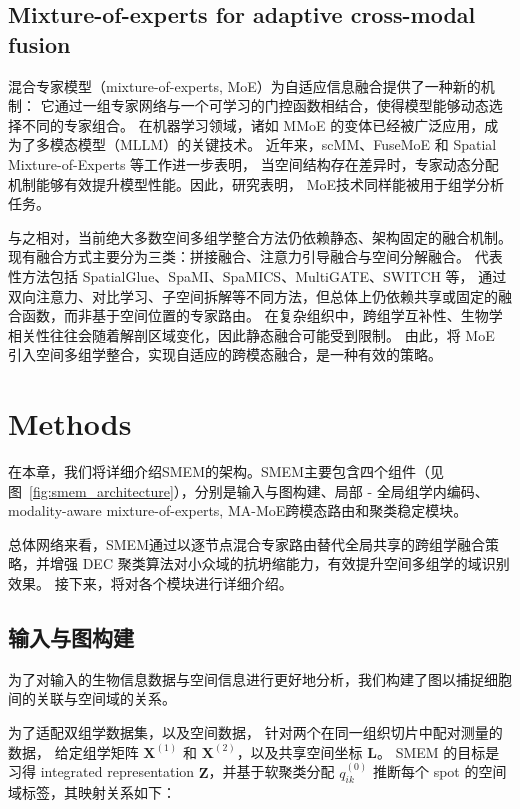 \documentclass[journal]{IEEEtran}
\begin{document}
\subsection{Mixture-of-experts for adaptive cross-modal fusion}
混合专家模型（mixture-of-experts, MoE）为自适应信息融合提供了一种新的机制：
它通过一组专家网络与一个可学习的门控函数相结合，使得模型能够动态选择不同的专家组合。
在机器学习领域，诸如 MMoE 的变体已经被广泛应用，成为了多模态模型（MLLM）的关键技术。
近年来，scMM、FuseMoE 和 Spatial Mixture-of-Experts 等工作进一步表明，
当空间结构存在差异时，专家动态分配机制能够有效提升模型性能。因此，研究表明\cite{GASTON-Mix 和GROVER }，
MoE技术同样能被用于组学分析任务。

与之相对，当前绝大多数空间多组学整合方法仍依赖静态、架构固定的融合机制。
现有融合方式主要分为三类：拼接融合、注意力引导融合与空间分解融合。
代表性方法包括 SpatialGlue、SpaMI、SpaMICS、MultiGATE、SWITCH 等，
通过双向注意力、对比学习、子空间拆解等不同方法，但总体上仍依赖共享或固定的融合函数，而非基于空间位置的专家路由。
在复杂组织中，跨组学互补性、生物学相关性往往会随着解剖区域变化，因此静态融合可能受到限制。
由此，将 MoE 引入空间多组学整合，实现自适应的跨模态融合，是一种有效的策略。



\section{Methods}

在本章，我们将详细介绍SMEM的架构。SMEM主要包含四个组件（见图~\ref{fig:smem_architecture}），分别是输入与图构建、局部 - 全局组学内编码、modality-aware mixture-of-experts, MA-MoE跨模态路由和聚类稳定模块。



总体网络来看，SMEM通过以逐节点混合专家路由替代全局共享的跨组学融合策略，并增强 DEC 聚类算法对小众域的抗坍缩能力，有效提升空间多组学的域识别效果。
接下来，将对各个模块进行详细介绍。

\subsection{输入与图构建}
为了对输入的生物信息数据与空间信息进行更好地分析，我们构建了图以捕捉细胞间的关联与空间域的关系。

为了适配双组学数据集，以及空间数据，
针对两个在同一组织切片中配对测量的数据，
给定组学矩阵 $\mathbf{X}^{(1)}$ 和 $\mathbf{X}^{(2)}$，以及共享空间坐标 $\mathbf{L}$。
SMEM 的目标是习得 integrated representation $\mathbf{Z}$，并基于软聚类分配 $q_{ik}^{(0)}$ 推断每个 spot 的空间域标签，其映射关系如下：
\end{document}
